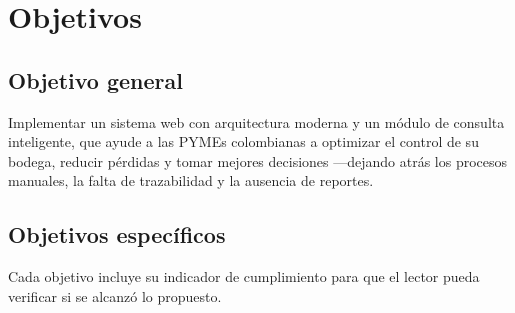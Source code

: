 
\section{Objetivos}

\subsection{Objetivo general}

Implementar un sistema web con arquitectura moderna y un módulo de consulta inteligente, que ayude a las PYMEs colombianas a optimizar el control de su bodega, reducir pérdidas y tomar mejores decisiones —dejando atrás los procesos manuales, la falta de trazabilidad y la ausencia de reportes.

\subsection{Objetivos específicos}

Cada objetivo incluye su indicador de cumplimiento para que el lector pueda verificar si se alcanzó lo propuesto.

